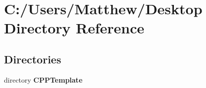 \section{C\+:/\+Users/\+Matthew/\+Desktop Directory Reference}
\label{dir_e04ae2849dfa520b4ee2c9f7e9ff15de}
\subsection*{Directories}
\begin{DoxyCompactItemize}
\item 
directory {\bf C\+P\+P\+Template}
\end{DoxyCompactItemize}
